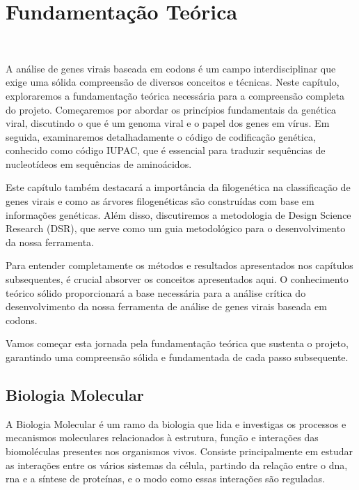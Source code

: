 
\setlength{\parskip}{0.3cm}

\chapter{Fundamentação Teórica}~\label{ch:fundamentacao}

A análise de genes virais baseada em codons é um campo interdisciplinar que exige uma sólida compreensão de diversos conceitos e técnicas. Neste capítulo, exploraremos a fundamentação teórica necessária para a compreensão completa do projeto. Começaremos por abordar os princípios fundamentais da genética viral, discutindo o que é um genoma viral e o papel dos genes em vírus. Em seguida, examinaremos detalhadamente o código de codificação genética, conhecido como código IUPAC, que é essencial para traduzir sequências de nucleotídeos em sequências de aminoácidos.

Este capítulo também destacará a importância da filogenética na classificação de genes virais e como as árvores filogenéticas são construídas com base em informações genéticas. Além disso, discutiremos a metodologia de Design Science Research (DSR), que serve como um guia metodológico para o desenvolvimento da nossa ferramenta.

Para entender completamente os métodos e resultados apresentados nos capítulos subsequentes, é crucial absorver os conceitos apresentados aqui. O conhecimento teórico sólido proporcionará a base necessária para a análise crítica do desenvolvimento da nossa ferramenta de análise de genes virais baseada em codons.

Vamos começar esta jornada pela fundamentação teórica que sustenta o projeto, garantindo uma compreensão sólida e fundamentada de cada passo subsequente.

\section{Biologia Molecular}
A Biologia Molecular é um ramo da biologia que lida e investigas os processos e mecanismos moleculares relacionados à estrutura, função e interações das biomoléculas presentes nos organismos vivos. Consiste principalmente em estudar as interações entre os vários sistemas da célula, partindo da relação entre o \gls{dna}, \gls{rna} e a síntese de proteínas, e o modo como essas interações são reguladas.

